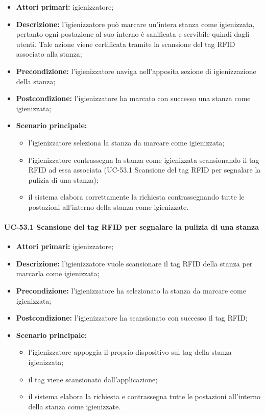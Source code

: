     \begin{itemize}
        \item \textbf{Attori primari:} igienizzatore;
        \item \textbf{Descrizione:} l’igienizzatore può marcare un'intera stanza come igienizzata, pertanto ogni postazione al suo interno è sanificata e servibile quindi dagli utenti. Tale azione viene certificata tramite la scansione del tag RFID associato alla stanza;
        \item \textbf{Precondizione:} l'igienizzatore naviga nell’apposita sezione di igienizzazione della stanza; 
        \item \textbf{Postcondizione:} l'igienizzatore ha marcato con successo una stanza come igienizzata;
        \item \textbf{Scenario principale:} 
            \begin{itemize}
                \item l'igienizzatore seleziona la stanza da marcare come igienizzata;	
                \item l'igienizzatore contrassegna la stanza come igienizzata scansionando il tag RFID ad essa associata (UC-53.1 Scansione del tag RFID per segnalare la pulizia di una stanza);
                \item il sistema elabora correttamente la richiesta contrassegnando tutte le postazioni all'interno della stanza come igienizzate.
            \end{itemize}
    \end{itemize}

\paragraph{UC-53.1 Scansione del tag RFID per segnalare la pulizia di una stanza}

    \begin{itemize}
        \item \textbf{Attori primari:} igienizzatore;
        \item \textbf{Descrizione:} l’igienizzatore vuole scansionare il tag RFID della stanza per marcarla come igienizzata;
        \item \textbf{Precondizione:} l'igienizzatore ha selezionato la stanza da marcare come igienizzata; 
        \item \textbf{Postcondizione:} l'igienizzatore ha scansionato con successo il tag RFID;
        \item \textbf{Scenario principale:} 
            \begin{itemize}	
                \item l'igienizzatore appoggia il proprio dispositivo sul tag della stanza igienizzata;
                \item il tag viene scansionato dall'applicazione;
                \item il sistema elabora la richiesta e contrassegna tutte le postazioni all'interno della stanza come igienizzate.
            \end{itemize}
    \end{itemize}
